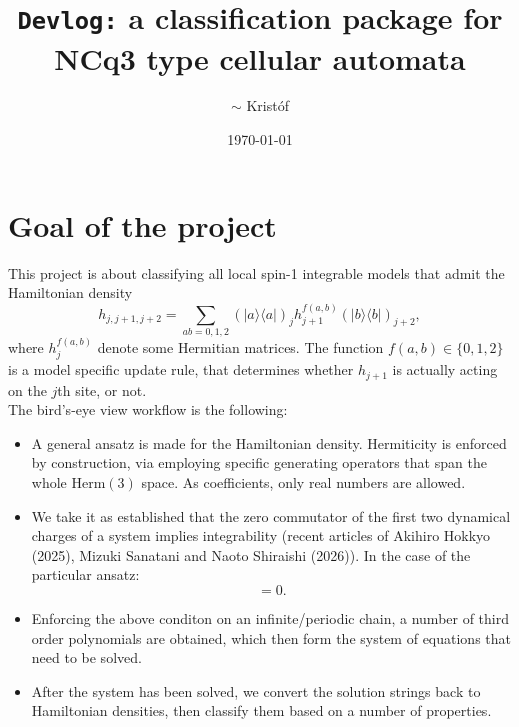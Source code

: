 \documentclass[a4paper, 11pt, twoside, onecolumn]{article}
\title{\Large{\texttt{Devlog:} \textbf{a classification package for NCq3 type cellular automata}}}
\author{$\sim$ Kristóf}
\date{\today}
\newcommand{\Q}{\mathcal{Q}}
\begin{document}
\maketitle

\section{Goal of the project}
This project is about classifying all local spin-1 integrable models that admit the Hamiltonian density
\begin{equation}
    h_{j,j+1,j+2}=\sum_{ab=0,1,2}(|{a}\rangle\langle{a}|)_j h_{j+1}^{f(a,b)}(|{b}\rangle\langle{b}|)_{j+2},
\end{equation}
where $h^{f(a,b)}_j$ denote some Hermitian matrices. The function $f(a,b)\in\{0,1,2\}$ is a model specific update rule, that determines whether $h_{j+1}$ is actually acting on the $j$th site, or not. \\

The bird's-eye view workflow is the following:
\begin{itemize}
    \item A general ansatz is made for the Hamiltonian density. Hermiticity is enforced by construction, via employing specific generating operators that span the whole $\mathrm{Herm(3)}$ space. As coefficients, only real numbers are allowed.
    \item We take it as established that the zero commutator of the first two dynamical charges of a system implies integrability (recent articles of Akihiro Hokkyo (2025), Mizuki Sanatani and Naoto Shiraishi (2026)). In the case of the particular ansatz:
    \begin{equation}
        [H, \Q_5] =0.
    \end{equation}
    \item Enforcing the above conditon on an infinite/periodic chain, a number of third order polynomials are obtained, which then form the system of equations that need to be solved.
    \item After the system has been solved, we convert the solution strings back to Hamiltonian densities, then classify them based on a number of properties. 
\end{itemize}
\end{document}
